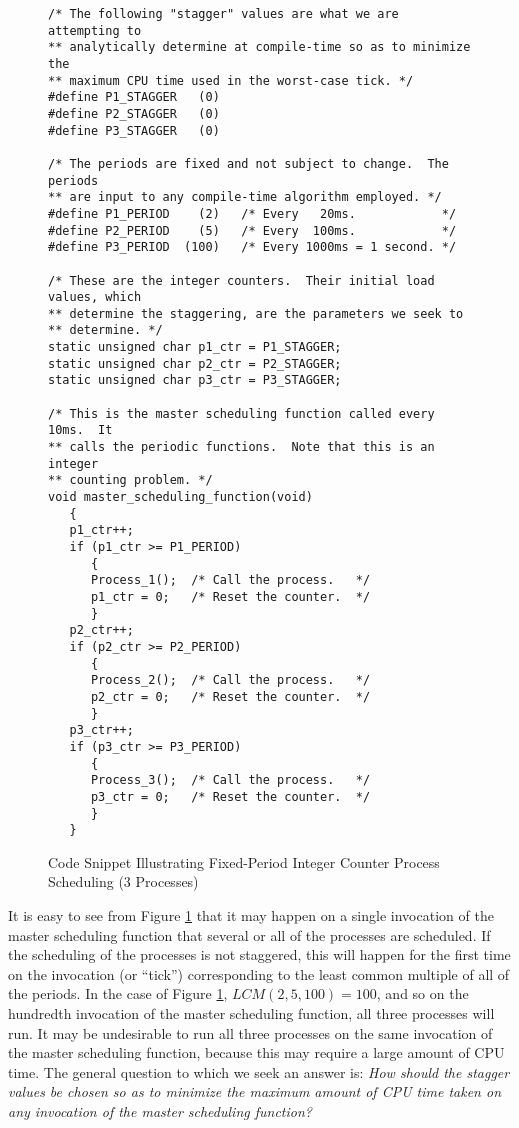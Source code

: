 \begin{figure}
\begin{small}
\begin{verbatim}
/* The following "stagger" values are what we are attempting to
** analytically determine at compile-time so as to minimize the
** maximum CPU time used in the worst-case tick. */ 
#define P1_STAGGER   (0)
#define P2_STAGGER   (0)
#define P3_STAGGER   (0)

/* The periods are fixed and not subject to change.  The periods
** are input to any compile-time algorithm employed. */
#define P1_PERIOD    (2)   /* Every   20ms.            */
#define P2_PERIOD    (5)   /* Every  100ms.            */
#define P3_PERIOD  (100)   /* Every 1000ms = 1 second. */

/* These are the integer counters.  Their initial load values, which
** determine the staggering, are the parameters we seek to
** determine. */
static unsigned char p1_ctr = P1_STAGGER;
static unsigned char p2_ctr = P2_STAGGER;
static unsigned char p3_ctr = P3_STAGGER;

/* This is the master scheduling function called every 10ms.  It 
** calls the periodic functions.  Note that this is an integer
** counting problem. */
void master_scheduling_function(void)
   {
   p1_ctr++;
   if (p1_ctr >= P1_PERIOD)
      {
      Process_1();  /* Call the process.   */
      p1_ctr = 0;   /* Reset the counter.  */
      }
   p2_ctr++;
   if (p2_ctr >= P2_PERIOD)
      {
      Process_2();  /* Call the process.   */
      p2_ctr = 0;   /* Reset the counter.  */
      }
   p3_ctr++;
   if (p3_ctr >= P3_PERIOD)
      {
      Process_3();  /* Call the process.   */
      p3_ctr = 0;   /* Reset the counter.  */
      }
   }
\end{verbatim}
\end{small}
\caption{Code Snippet Illustrating Fixed-Period Integer Counter Process Scheduling
        (3 Processes)}
\label{fig:cdta0:spsi0:01}
\end{figure}


It is easy to see from Figure \ref{fig:cdta0:spsi0:01} that it may happen
on a single invocation of the master scheduling function that several or all of 
the processes are scheduled.  If the scheduling of the
processes is not staggered, this will happen for the first time
on the invocation (or ``tick'')
corresponding to the least common multiple of all of the periods.  In
the case of Figure \ref{fig:cdta0:spsi0:01}, $LCM(2,5,100) = 100$, and so
on the hundredth invocation of the master scheduling function, all three processes will
run.  It may be undesirable to run all three processes on the same invocation of
the master scheduling function, because this may require a large amount of CPU time.
The general question to which we seek an answer is:  \emph{How should the
stagger values be chosen so as to minimize the maximum amount of CPU
time taken on any invocation of the master scheduling function?}

